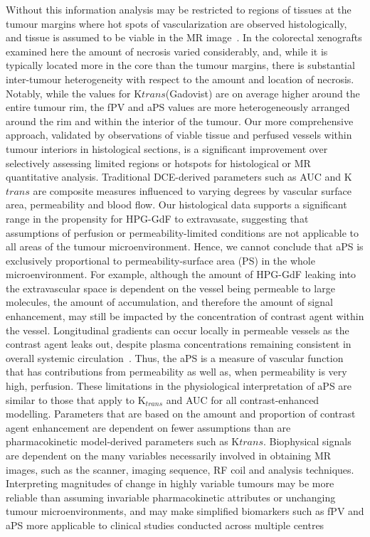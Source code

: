 Without this information analysis may be restricted to regions of tissues at the tumour margins where hot spots of vascularization are observed histologically, and tissue is assumed to be viable in the MR image~\cite{Pathak:2005gu,Li:2005gw}.
In the colorectal xenografts examined here the amount of necrosis varied considerably, and, while it is typically located more in the core than the tumour margins, there is substantial inter-tumour heterogeneity with respect to the amount and location of necrosis.
Notably, while the values for K${trans}$(Gadovist) are on average higher around the entire tumour rim, the fPV and aPS values are more heterogeneously arranged around the rim and within the interior of the tumour.
Our more comprehensive approach, validated by observations of viable tissue and perfused vessels within tumour interiors in histological sections, is a significant improvement over selectively assessing limited regions or hotspots for histological or MR quantitative analysis.
Traditional DCE-derived parameters such as AUC and K${trans}$ are composite measures influenced to varying degrees by vascular surface area, permeability and blood flow.
Our histological data supports a significant range in the propensity for HPG-GdF to extravasate, suggesting that assumptions of perfusion or permeability-limited conditions are not applicable to all areas of the tumour microenvironment.
Hence, we cannot conclude that aPS is exclusively proportional to permeability-surface area (PS) in the whole microenvironment.
For example, although the amount of HPG-GdF leaking into the extravascular space is dependent on the vessel being permeable to large molecules, the amount of accumulation, and therefore the amount of signal enhancement, may still be impacted by the concentration of contrast agent within the vessel.
Longitudinal gradients can occur locally in permeable vessels as the contrast agent leaks out, despite plasma concentrations remaining consistent in overall systemic circulation~\cite{Erickson:2003wt,Dewhirst:1999jh}.
Thus, the aPS is a measure of vascular function that has contributions from permeability as well as, when permeability is very high, perfusion.
These limitations in the physiological interpretation of aPS are similar to those that apply to K$_{trans}$ and AUC for all contrast-enhanced modelling.
Parameters that are based on the amount and proportion of contrast agent enhancement are dependent on fewer assumptions than are pharmacokinetic model-derived parameters such as K${trans}$.
Biophysical signals are dependent on the many variables necessarily involved in obtaining MR images, such as the scanner, imaging sequence, RF coil and analysis techniques.
Interpreting magnitudes of change in highly variable tumours may be more reliable than assuming invariable pharmacokinetic attributes or unchanging tumour microenvironments, and may make simplified biomarkers such as fPV and aPS more applicable to clinical studies conducted across multiple centres~\cite{OConnor:2012ie}


